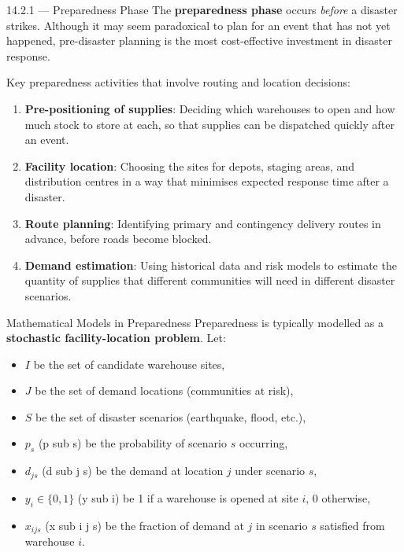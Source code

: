\documentclass[aspectratio=169,10pt]{beamer}
\begin{document}
\begin{frame}[allowframebreaks]{14.2.1 --- Preparedness Phase}
  The \textbf{preparedness phase} occurs \emph{before} a disaster strikes.
  Although it may seem paradoxical to plan for an event that has not yet
  happened, pre-disaster planning is the most cost-effective investment
  in disaster response.

  \medskip
  Key preparedness activities that involve routing and location decisions:
  \begin{enumerate}
    \item \textbf{Pre-positioning of supplies}: Deciding which warehouses
          to open and how much stock to store at each, so that supplies
          can be dispatched quickly after an event.
    \item \textbf{Facility location}: Choosing the sites for depots,
          staging areas, and distribution centres in a way that
          minimises expected response time after a disaster.
    \item \textbf{Route planning}: Identifying primary and contingency
          delivery routes in advance, before roads become blocked.
    \item \textbf{Demand estimation}: Using historical data and
          risk models to estimate the quantity of supplies that
          different communities will need in different disaster scenarios.
  \end{enumerate}

  \framebreak

  \begin{block}{Mathematical Models in Preparedness}
    Preparedness is typically modelled as a \textbf{stochastic
    facility-location problem}. Let:
    \begin{itemize}
      \item $I$ be the set of candidate warehouse sites,
      \item $J$ be the set of demand locations (communities at risk),
      \item $S$ be the set of disaster scenarios (earthquake, flood, etc.),
      \item $p_s$ (p sub s) be the probability of scenario $s$ occurring,
      \item $d_{js}$ (d sub j s) be the demand at location $j$ under
            scenario $s$,
      \item $y_i \in \{0,1\}$ (y sub i) be 1 if a warehouse is opened at
            site $i$, 0 otherwise,
      \item $x_{ijs}$ (x sub i j s) be the fraction of demand at $j$ in
            scenario $s$ satisfied from warehouse $i$.
    \end{itemize}


\end{block}
\end{frame}
\end{document}

